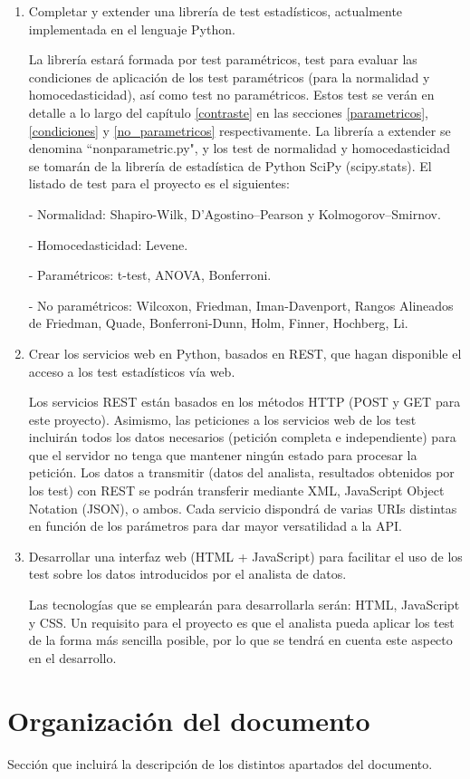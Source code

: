 \begin{enumerate}
\item Completar y extender una librería de test estadísticos, actualmente implementada en el lenguaje Python.

La librería estará formada por test paramétricos, test para evaluar las condiciones de aplicación de los test
paramétricos (para la normalidad y homocedasticidad), así como test no paramétricos. Estos test se verán en
detalle a lo largo del capítulo \ref{contraste} en las secciones \ref{parametricos}, \ref{condiciones} y
\ref{no_parametricos} respectivamente. La librería a extender se denomina ``nonparametric.py", y los test de
normalidad y homocedasticidad se tomarán de la librería de estadística de Python SciPy (scipy.stats). El listado
de test para el proyecto es el siguientes:

- Normalidad: Shapiro-Wilk, D’Agostino–Pearson y Kolmogorov–Smirnov.

- Homocedasticidad: Levene.

- Paramétricos: t-test, ANOVA, Bonferroni.

- No paramétricos: Wilcoxon, Friedman, Iman-Davenport, Rangos Alineados de Friedman, Quade, Bonferroni-Dunn,
Holm, Finner, Hochberg, Li.

\item Crear los servicios web en Python, basados en REST, que hagan disponible el acceso a los
test estadísticos vía web.

Los servicios REST están basados en los métodos HTTP (POST y GET para este proyecto). Asimismo, las peticiones
a los servicios web de los test incluirán todos los datos necesarios (petición completa e independiente) para
que el servidor no tenga que mantener ningún estado para procesar la petición. Los datos a transmitir (datos del
analista, resultados obtenidos por los test) con REST se podrán transferir mediante XML, JavaScript Object
Notation (JSON), o ambos. Cada servicio dispondrá de varias URIs distintas en función de los parámetros para dar
mayor versatilidad a la API.

\item Desarrollar una interfaz web (HTML + JavaScript) para facilitar el uso de los test sobre los
datos introducidos por el analista de datos.

Las tecnologías que se emplearán para desarrollarla serán: HTML, JavaScript y CSS. Un requisito para el proyecto
es que el analista pueda aplicar los test de la forma más sencilla posible, por lo que se tendrá en cuenta este
aspecto en el desarrollo.
\end{enumerate}


\section{Organización del documento}
Sección que incluirá la descripción de los distintos apartados del documento.


